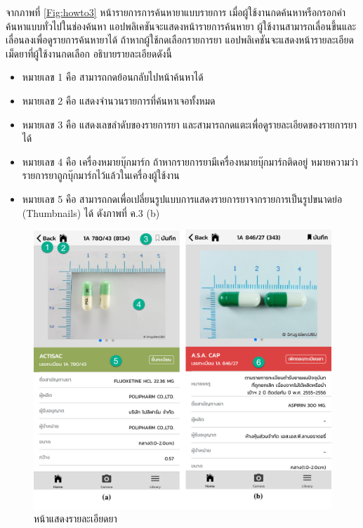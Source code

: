 จากภาพที่ \ref{Fig:howto3} หน้ารายการการค้นหายาแบบรายการ เมื่อผู้ใช้งานกดค้นหาหรือกรอกคำค้นหาแบบทั่วไปในช่องค้นหา แอปพลิเคชันจะแสดงหน้ารายการค้นหายา ผู้ใช้งานสามารถเลื่อนขึ้นและเลื่อนลงเพื่อดูรายการค้นหายาได้ ถ้าหากผู้ใช้กดเลือกรายการยา แอปพลิเคชันจะแสดงหน้ารายละเอียดเม็ดยาที่ผู้ใช้งานกดเลือก อธิบายรายละเอียดดังนี้
\begin{itemize}[label={--}]
	\item หมายเลข 1 คือ สามารถกดย้อนกลับไปหน้าค้นหาได้
    \item หมายเลข 2 คือ แสดงจำนวนรายการที่ค้นหาเจอทั้งหมด
    \item หมายเลข 3 คือ แสดงเลขลำดับของรายการยา และสามารถกดแตะเพื่อดูรายละเอียดของรายการยาได้
    \item หมายเลข 4 คือ เครื่องหมายบุ๊กมาร์ก ถ้าหากรายการยามีเครื่องหมายบุ๊กมาร์กติดอยู่ หมายความว่า รายการยาถูกบุ๊กมาร์กไว้แล้วในเครื่องผู้ใช้งาน
    \item หมายเลข 5 คือ สามารถกดเพื่อเปลี่ยนรูปแบบการแสดงรายการยาจากรายการเป็นรูปขนาดย่อ  (Thumbnails) ได้ ดังภาพที่ ค.3 (b)
\end{itemize}

\begin{figure}[H]
    \includegraphics[width=\columnwidth]{Figures/7/17}
    \caption{หน้าแสดงรายละเอียดยา}
    \label{Fig:howto4}
\end{figure}

